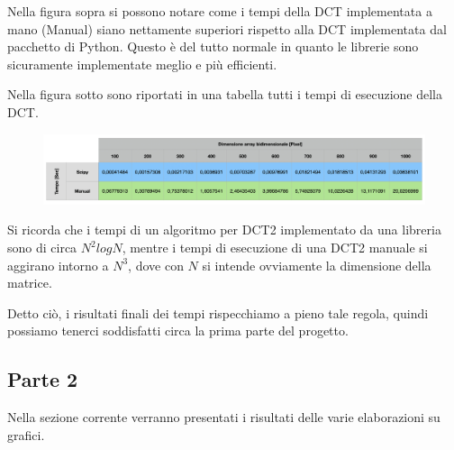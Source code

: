 \documentclass[preprint,12pt]{elsarticle}
\begin{document}
Nella figura sopra si possono notare come i tempi della DCT implementata a mano (Manual) siano nettamente superiori rispetto alla DCT implementata dal pacchetto di Python. Questo è del tutto normale in quanto le librerie sono sicuramente implementate meglio e più efficienti.

\newpage
Nella figura sotto sono riportati in una tabella tutti i tempi di esecuzione della DCT.

\begin{figure}[H]
	\centering
	\includegraphics[width=\linewidth]{tabella}
\end{figure}

Si ricorda che i tempi di un algoritmo per DCT2 implementato da una libreria sono di circa $N^2 logN$, mentre i tempi di esecuzione di una DCT2 manuale si aggirano intorno a $N^3$, dove con $N$ si intende ovviamente la dimensione della matrice.

Detto ciò, i risultati finali dei tempi rispecchiamo a pieno tale regola, quindi possiamo tenerci soddisfatti circa la prima parte del progetto. 
\subsection{Parte 2}
Nella sezione corrente verranno presentati i risultati delle varie elaborazioni su grafici.
\end{document}
